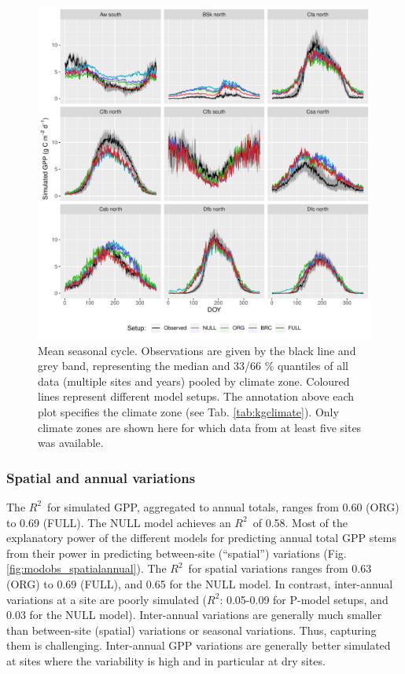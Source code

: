 \documentclass[gmd, manuscript]{copernicus}
\newcommand{\rsq}{$R^2$}
\begin{document}
 \begin{figure}[!ht]
\includegraphics[width=\textwidth]{fig/meandoy_byzone.pdf}
\caption{Mean seasonal cycle. Observations are given by the black line and grey band, representing the median and 33/66 \% quantiles of all data (multiple sites and years) pooled by climate zone. Coloured lines represent different model setups. The annotation above each plot specifies the climate zone (see Tab. \ref{tab:kgclimate}). Only climate zones are shown here for which data from at least five sites was available.}
    \label{fig:season}
\end{figure}

\clearpage


\subsubsection{Spatial and annual variations}

The \rsq\ for simulated GPP, aggregated to annual totals, ranges from 0.60 (ORG) to 0.69 (FULL). The NULL model achieves an \rsq\ of 0.58. Most of the explanatory power of the different models for predicting annual total GPP stems from their power in predicting between-site (``spatial'') variations (Fig. \ref{fig:modobs_spatialannual}). The \rsq\ for spatial variations ranges from 0.63 (ORG) to 0.69 (FULL), and 0.65 for the NULL model. In contrast, inter-annual  variations at a site are poorly simulated (\rsq : 0.05-0.09 for P-model setups, and 0.03 for the NULL model). Inter-annual variations are generally much smaller than between-site (spatial) variations or seasonal variations. Thus, capturing them is challenging. Inter-annual GPP variations are generally better simulated at sites where the variability is high and in particular at dry sites.
\end{document}

